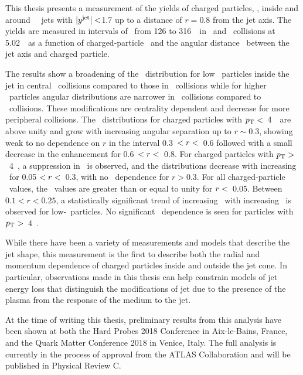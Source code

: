 
This thesis presents a measurement of the yields of charged particles, \Dptr, inside and around \RFour\ \antikt\ jets with $|\mbox{$y^{\mathrm{jet}}$}| <$1.7 up to a distance of $r = 0.8$ from the jet axis.
The yields are measured in intervals of \ptjet\ from 126 to 316~\GeV\ in \PbPb\ and \pp\ collisions at 5.02~\TeV\ as a function of charged-particle \pt\ and the angular distance \rvar\ between the jet axis and charged particle.

The results show a broadening of the \Dptr\ distribution for low \pt\ particles inside the jet in central \pbpb\ collisions compared to those in \pp\ collisions while for higher \pt\ particles angular distributions are narrower in \pbpb\ collisions compared to \pp\ collisions.
These modifications are centrality dependent and decrease for more peripheral collisions.
The \RDptr\ distributions for charged particles with $\mbox{$p_{\mathrm{T}}$} <$~4~\GeV\ are above unity and grow with increasing angular separation up to $r \sim0.3$, showing weak to no dependence on $r$ in the interval 0.3~$< \mbox{$r$} <$~0.6 followed with a small decrease in the enhancement for 0.6~$< \mbox{$r$} <$~0.8.
For charged particles with $\mbox{$p_{\mathrm{T}}$} >$~4~\GeV, a suppression in \RDptr\ is observed, and the distributions decrease with increasing \rvar\ for 0.05 $ < \mbox{$r$} < $~0.3, with no \rvar\ dependence for $r>0.3$.
For all charged-particle \pt\ values, the \RDptr\ values are greater than or equal to unity for $\mbox{$r$} <$~0.05.
Between $0.1 < r < 0.25$, a statistically significant trend of increasing \RDptr\ with increasing \ptjet\ is observed for low-\pt\ particles.
No significant \ptjet\ dependence is seen for particles  with $\mbox{$p_{\mathrm{T}}$} >$~4~\GeV.

While there have been a variety of measurements and models that describe the jet shape, this measurement is the first to describe both the radial and momentum dependence of charged particles inside and outside the jet cone. In particular, observations made in this thesis can help constrain models of jet energy loss that distinguish the modifications of jet due to the presence of the plasma from the response of the medium to the jet.

At the time of writing this thesis, preliminary results from this analysis have been shown at both the Hard Probes 2018 Conference in Aix-le-Bains, France, and the Quark Matter Conference 2018 in Venice, Italy. The full analysis is currently in the process of approval from the ATLAS Collaboration and will be published in Physical Review C.
